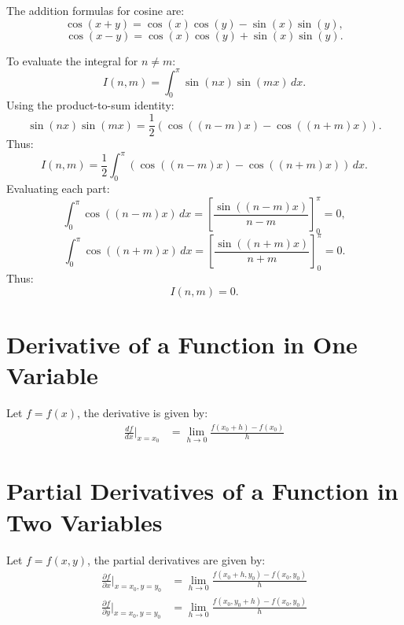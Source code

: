 \documentclass[a4paper,12pt]{article}
\begin{document}
\begin{multicols}{2}
The addition formulas for cosine are:
\[
\cos(x+y) = \cos(x) \cos(y) - \sin(x) \sin(y),
\]
\[
\cos(x-y) = \cos(x) \cos(y) + \sin(x) \sin(y). \tag{L4}
\]

To evaluate the integral for \(n \neq m\):
\[
I(n, m) = \int_0^{\pi} \sin(nx) \sin(mx) \, dx.
\]
Using the product-to-sum identity:
\[
\sin(nx) \sin(mx) = \frac{1}{2} \left( \cos((n-m)x) - \cos((n+m)x) \right). \tag{L5}
\]
Thus:
\[
I(n, m) = \frac{1}{2} \int_0^{\pi} \left( \cos((n-m)x) - \cos((n+m)x) \right) \, dx.
\]
Evaluating each part:
\[
\int_0^{\pi} \cos((n-m)x) \, dx = \left[ \frac{\sin((n-m)x)}{n-m} \right]_0^{\pi} = 0,
\]
\[
\int_0^{\pi} \cos((n+m)x) \, dx = \left[ \frac{\sin((n+m)x)}{n+m} \right]_0^{\pi} = 0.
\]
Thus:
\[
I(n, m) = 0. \tag{L6}
\]

\section*{Derivative of a Function in One Variable}
Let $f = f(x)$, the derivative is given by:
\begin{align*}
    \frac{df}{dx}\bigg|_{x=x_0} &= \lim_{h \to 0} \frac{f(x_0 + h) - f(x_0)}{h}
\end{align*}

\section*{Partial Derivatives of a Function in Two Variables}
Let $f = f(x, y)$, the partial derivatives are given by:
\begin{align*}
    \frac{\partial f}{\partial x}\bigg|_{x = x_0, y = y_0} &= \lim_{h \to 0} \frac{f(x_0 + h, y_0) - f(x_0, y_0)}{h} \\
    \frac{\partial f}{\partial y}\bigg|_{x = x_0, y = y_0} &= \lim_{h \to 0} \frac{f(x_0, y_0 + h) - f(x_0, y_0)}{h}
\end{align*}

\end{multicols}
\end{document}
